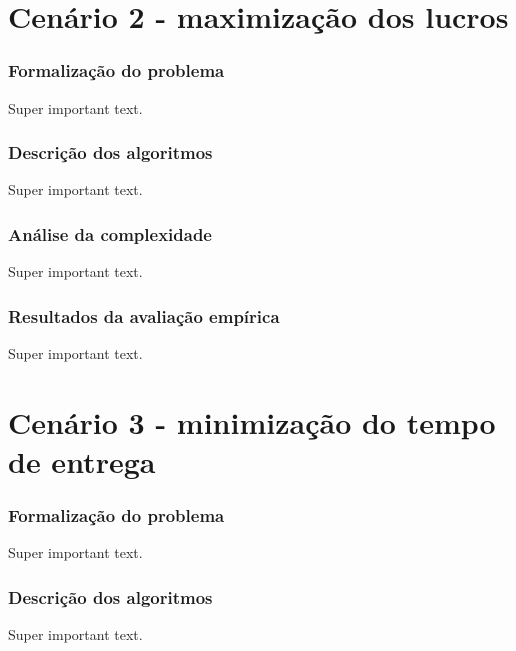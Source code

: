 \documentclass{beamer}
\begin{document}






\section{Cenário 2 - maximização dos lucros}

\begin{frame}
  \frametitle{Formalização do problema}
  Super important text.
\end{frame}

\begin{frame}
  \frametitle{Descrição dos algoritmos}
  Super important text.
\end{frame}

\begin{frame}
  \frametitle{Análise da complexidade}
  Super important text.
\end{frame}

\begin{frame}
  \frametitle{Resultados da avaliação empírica}
  Super important text.
\end{frame}








\section{Cenário 3 - minimização do tempo de entrega}

\begin{frame}
  \frametitle{Formalização do problema}
  Super important text.
\end{frame}

\begin{frame}
  \frametitle{Descrição dos algoritmos}
  Super important text.
\end{frame}
\end{document}
